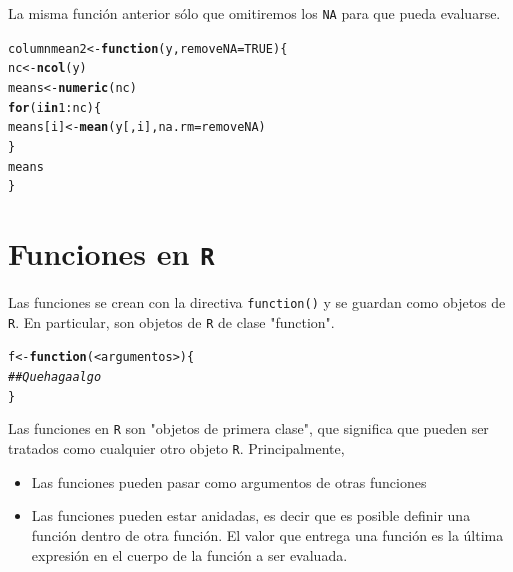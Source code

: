 \documentclass{article}\usepackage[]{graphicx}\usepackage[]{color}
\makeatletter
\newcommand{\hlnum}[1]{\textcolor[rgb]{0.686,0.059,0.569}{#1}}%
\newcommand{\hlcom}[1]{\textcolor[rgb]{0.678,0.584,0.686}{\textit{#1}}}%
\newcommand{\hlopt}[1]{\textcolor[rgb]{0,0,0}{#1}}%
\newcommand{\hlstd}[1]{\textcolor[rgb]{0.345,0.345,0.345}{#1}}%
\newcommand{\hlkwa}[1]{\textcolor[rgb]{0.161,0.373,0.58}{\textbf{#1}}}%
\newcommand{\hlkwb}[1]{\textcolor[rgb]{0.69,0.353,0.396}{#1}}%
\newcommand{\hlkwc}[1]{\textcolor[rgb]{0.333,0.667,0.333}{#1}}%
\newcommand{\hlkwd}[1]{\textcolor[rgb]{0.737,0.353,0.396}{\textbf{#1}}}%
\newenvironment{kframe}{%
 \def\at@end@of@kframe{}%
 \ifinner\ifhmode%
  \def\at@end@of@kframe{\end{minipage}}%
  \begin{minipage}{\columnwidth}%
 \fi\fi%
 \def\FrameCommand##1{\hskip\@totalleftmargin \hskip-\fboxsep
 \colorbox{shadecolor}{##1}\hskip-\fboxsep
     \hskip-\linewidth \hskip-\@totalleftmargin \hskip\columnwidth}%
 \MakeFramed {\advance\hsize-\width
   \@totalleftmargin\z@ \linewidth\hsize
   \@setminipage}}%
 {\par\unskip\endMakeFramed%
 \at@end@of@kframe}
\newenvironment{knitrout}{}{} %
\makeatother
\begin{document}
La misma función anterior sólo que omitiremos los \texttt{NA} para que pueda evaluarse.
\begin{knitrout}
\color{fgcolor}\begin{kframe}
\begin{alltt}
\hlstd{columnmean2} \hlkwb{<-} \hlkwa{function}\hlstd{(}\hlkwc{y}\hlstd{,} \hlkwc{removeNA} \hlstd{=} \hlnum{TRUE}\hlstd{) \{}
  \hlstd{nc} \hlkwb{<-} \hlkwd{ncol}\hlstd{(y)}
  \hlstd{means} \hlkwb{<-} \hlkwd{numeric}\hlstd{(nc)}
    \hlkwa{for}\hlstd{(i} \hlkwa{in} \hlnum{1}\hlopt{:}\hlstd{nc) \{}
    \hlstd{means[i]} \hlkwb{<-} \hlkwd{mean}\hlstd{(y[, i],} \hlkwc{na.rm} \hlstd{= removeNA)}
    \hlstd{\}}
  \hlstd{means}
\hlstd{\}}
\end{alltt}
\end{kframe}
\end{knitrout}

\section{Funciones en \texttt{R}}
Las funciones se crean con la directiva \texttt{function()} y se guardan como objetos de \texttt{R}. En particular, son objetos de \texttt{R} de clase "function".
\begin{knitrout}
\color{fgcolor}\begin{kframe}
\begin{alltt}
f <- \hlkwd{function}(<argumentos>) \{
\hlcom{  ## Que haga algo  }
\}
\end{alltt}
\end{kframe}
\end{knitrout}

Las funciones en \texttt{R} son "objetos de primera clase", que significa que pueden ser tratados como cualquier otro objeto \texttt{R}. Principalmente,
  \begin{itemize}
    \item Las funciones pueden pasar como argumentos de otras funciones
    \item Las funciones pueden estar anidadas, es decir que es posible definir una función dentro de otra función. El valor que entrega una función es la última expresión en el cuerpo de la función a ser evaluada.
  \end{itemize}
\end{document}
